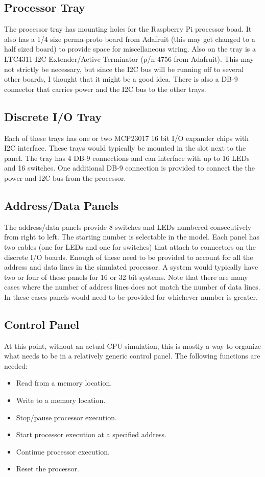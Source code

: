 \documentclass[10pt, openany]{book}
\begin{document}
\subsection{Processor Tray}
 The processor tray has mounting holes for the Raspberry Pi processor boad. It also has a 1/4 size perma-proto board from Adafruit (this may get changed to a half sized board) to provide space for miscellaneous wiring.  Also on the tray is a LTC4311 I2C Extender/Active Terminator (p/n 4756 from Adafruit).  This may not strictly be necessary, but since the I2C bus will be running off to several other boards, I thought that it might be a good idea.  There is also a DB-9 connector that carries power and the I2C bus to the other trays.

\subsection{Discrete I/O Tray}
Each of these trays has one or two MCP23017 16 bit I/O expander chips with I2C interface.  These trays would typically be mounted in the slot next to the panel.  The tray has 4 DB-9 connections and can interface with up to  16 LEDs and 16 switches.  One additional DB-9 connection is provided to connect the the power and I2C bus from the processor.

\subsection{Address/Data Panels}
The address/data panels provide 8 switches and LEDs numbered consecutively from right to left.  The starting number is selectable in the model.  Each panel has two cables (one for LEDs and one for switches) that attach to connectors on the discrete I/O boards.  Enough of these need to be provided to account for all the address and data lines in the simulated processor.  A system would typically have two or four of these panels for 16 or 32 bit systems.  Note that there are many cases where the number of address lines does not match the number of data lines.  In these cases panels would need to be provided for whichever number is greater.

\subsection{Control Panel}
At this point, without an actual CPU simulation, this is mostly a way to organize what needs to be in a relatively generic control panel.  The following functions are needed:
\begin{itemize}
  \item Read from a memory location.
  \item Write to a memory location.
  \item Stop/pause processor execution.
  \item Start processor execution at a specified address.
  \item Continue processor execution.
  \item Reset the processor.
\end{itemize}
\end{document}
